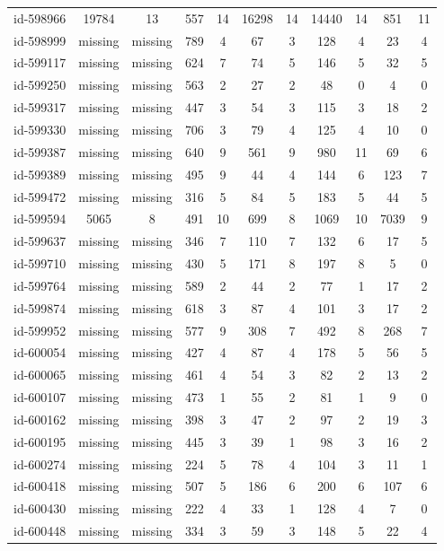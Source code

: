 \begin{tabular}{ccccccccccc}
id-598966 & 19784 & 13 & 557 & 14 & 16298 & 14 & 14440 & 14 & 851 & 11\\
id-598999 & missing & missing & 789 & 4 & 67 & 3 & 128 & 4 & 23 & 4\\
id-599117 & missing & missing & 624 & 7 & 74 & 5 & 146 & 5 & 32 & 5\\
id-599250 & missing & missing & 563 & 2 & 27 & 2 & 48 & 0 & 4 & 0\\
id-599317 & missing & missing & 447 & 3 & 54 & 3 & 115 & 3 & 18 & 2\\
id-599330 & missing & missing & 706 & 3 & 79 & 4 & 125 & 4 & 10 & 0\\
id-599387 & missing & missing & 640 & 9 & 561 & 9 & 980 & 11 & 69 & 6\\
id-599389 & missing & missing & 495 & 9 & 44 & 4 & 144 & 6 & 123 & 7\\
id-599472 & missing & missing & 316 & 5 & 84 & 5 & 183 & 5 & 44 & 5\\
id-599594 & 5065 & 8 & 491 & 10 & 699 & 8 & 1069 & 10 & 7039 & 9\\
id-599637 & missing & missing & 346 & 7 & 110 & 7 & 132 & 6 & 17 & 5\\
id-599710 & missing & missing & 430 & 5 & 171 & 8 & 197 & 8 & 5 & 0\\
id-599764 & missing & missing & 589 & 2 & 44 & 2 & 77 & 1 & 17 & 2\\
id-599874 & missing & missing & 618 & 3 & 87 & 4 & 101 & 3 & 17 & 2\\
id-599952 & missing & missing & 577 & 9 & 308 & 7 & 492 & 8 & 268 & 7\\
id-600054 & missing & missing & 427 & 4 & 87 & 4 & 178 & 5 & 56 & 5\\
id-600065 & missing & missing & 461 & 4 & 54 & 3 & 82 & 2 & 13 & 2\\
id-600107 & missing & missing & 473 & 1 & 55 & 2 & 81 & 1 & 9 & 0\\
id-600162 & missing & missing & 398 & 3 & 47 & 2 & 97 & 2 & 19 & 3\\
id-600195 & missing & missing & 445 & 3 & 39 & 1 & 98 & 3 & 16 & 2\\
id-600274 & missing & missing & 224 & 5 & 78 & 4 & 104 & 3 & 11 & 1\\
id-600418 & missing & missing & 507 & 5 & 186 & 6 & 200 & 6 & 107 & 6\\
id-600430 & missing & missing & 222 & 4 & 33 & 1 & 128 & 4 & 7 & 0\\
id-600448 & missing & missing & 334 & 3 & 59 & 3 & 148 & 5 & 22 & 4\\

\end{tabular}
